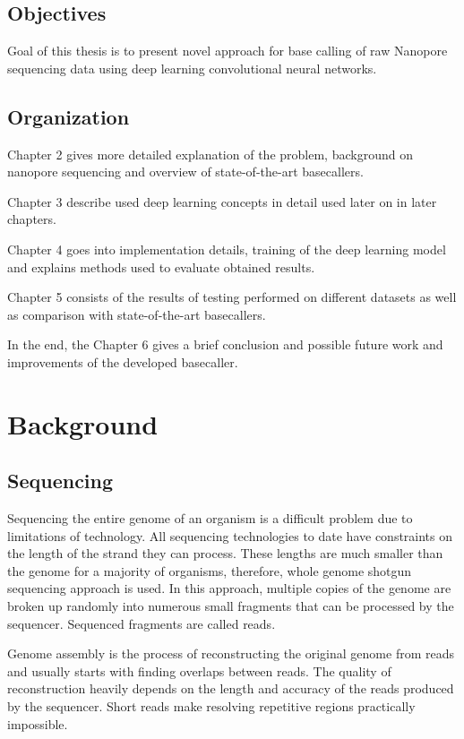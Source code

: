 \documentclass[times, utf8, diplomski, english]{fer}
\begin{document}
\section{Objectives}
Goal of this thesis is to present novel approach for base calling of raw Nanopore sequencing data using deep learning convolutional neural networks.
\section{Organization}
\indent Chapter 2 gives more detailed explanation of the problem, background on nanopore sequencing and overview of state-of-the-art basecallers.

Chapter 3 describe used deep learning concepts in detail used later on in later chapters.

Chapter 4 goes into implementation details, training of the deep learning model and explains methods used to evaluate obtained results. 

Chapter 5 consists of the results of testing performed on different datasets as well as comparison with state-of-the-art basecallers.

In the end, the Chapter 6 gives a brief conclusion and possible future work and improvements of the developed basecaller.

\chapter{Background}

\section{Sequencing}

Sequencing the entire genome of an organism is a difficult problem due to limitations of technology.
All sequencing technologies to date have constraints on the length of the strand they can process. 
These lengths are much smaller than the genome for a majority of organisms, therefore, whole genome shotgun sequencing approach is used. 
In this approach, multiple copies of the genome are broken up randomly into numerous small fragments that can be processed by the sequencer. Sequenced fragments are called reads.

Genome assembly is the process of reconstructing the original genome from reads and usually starts with finding overlaps between reads.
The quality of reconstruction heavily depends on the length and accuracy of the reads produced by the sequencer. Short reads make resolving repetitive regions practically impossible.
\end{document}
